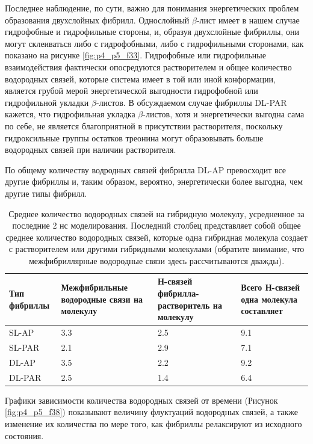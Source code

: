     Последнее наблюдение, по сути, важно для понимания энергетических проблем образования двухслойных фибрилл. Однослойный $\beta$-лист имеет в нашем случае гидрофобные и гидрофильные стороны, и, образуя двухслойные фибриллы, они могут склеиваться либо с гидрофобными, либо с гидрофильными сторонами, как показано на рисунке \ref{fig:p4_p5_f33}. Гидрофобные или гидрофильные взаимодействия фактически опосредуются растворителем и общее количество водородных связей, которые система имеет в той или иной конформации, является грубой мерой энергетической выгодности гидрофобной или гидрофильной укладки $\beta$-листов. В обсуждаемом случае фибриллы DL-PAR кажется, что гидрофильная укладка $\beta$-листов, хотя и энергетически выгодна сама по себе, не является благоприятной в присутствии растворителя, поскольку гидроксильные группы остатков треонина могут образовывать больше водородных связей при наличии растворителя.

    По общему количеству водродных связей фибрилла DL-AP превосходит все другие фибриллы и, таким образом, вероятно, энергетически более выгодна, чем другие типы фибрилл.

\begin{table}[H]
    \centering
    \begin{tabularx}{\textwidth}{|X|X|X|X|}
    Тип фибриллы & Межфибрильные водородные связи на молекулу & Н-связей фибрилла-растворитель на молекулу & Всего Н-связей одна молекула составляет \\
    \hline
    SL-AP  & 3.3 & 2.5 & 9.1\\
    \hline
    SL-PAR & 2.1 & 2.9 & 7.1\\
    \hline
    DL-AP  & 3.5 & 2.2 & 9.2\\
    \hline
    DL-PAR & 2.5 & 1.4 & 6.4\\
    \hline
    \end{tabularx}
    \caption[Среднее количество водородных связей на гибридную молекулу, усредненное за последние 2 нс моделирования]{Среднее количество водородных связей на гибридную молекулу, усредненное за последние 2 нс моделирования. Последний столбец представляет собой общее среднее количество водородных связей, которые одна гибридная молекула создает с растворителем или другими гибридными молекулами (обратите внимание, что межфибриллярные водородные связи здесь рассчитываются дважды).}
    \label{tab:p4_t1}
\end{table}


    Графики зависимости количества водородных связей от времени (Рисунок \ref{fig:p4_p5_f38}) показывают величину флуктуаций водородных связей, а также изменение их количества по мере того, как фибриллы релаксируют из исходного состояния.


